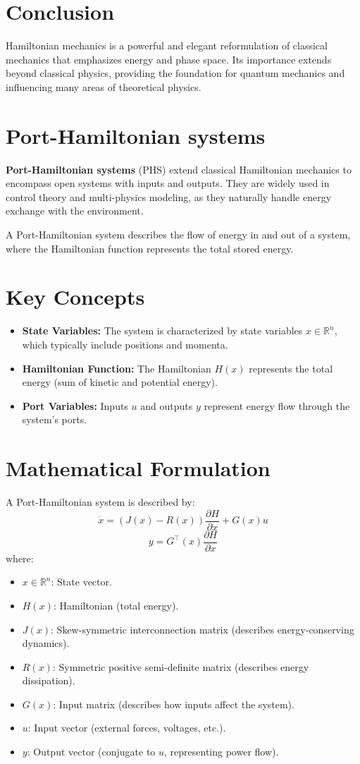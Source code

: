 \section{Conclusion}
Hamiltonian mechanics is a powerful and elegant reformulation of classical mechanics that emphasizes energy and phase space. Its importance extends beyond classical physics, providing the foundation for quantum mechanics and influencing many areas of theoretical physics.



\section{Port-Hamiltonian systems}
\textbf{Port-Hamiltonian systems} (PHS) extend classical Hamiltonian mechanics to encompass open systems with inputs and outputs. They are widely used in control theory and multi-physics modeling, as they naturally handle energy exchange with the environment.

A Port-Hamiltonian system describes the flow of energy in and out of a system, where the Hamiltonian function represents the total stored energy.

\section{Key Concepts}
\begin{itemize}
    \item \textbf{State Variables:} The system is characterized by state variables $x \in \mathbb{R}^n$, which typically include positions and momenta.
    \item \textbf{Hamiltonian Function:} The Hamiltonian $H(x)$ represents the total energy (sum of kinetic and potential energy).
    \item \textbf{Port Variables:} Inputs $u$ and outputs $y$ represent energy flow through the system's ports.
\end{itemize}

\section{Mathematical Formulation}
A Port-Hamiltonian system is described by:
\[
\dot{x} = \left( J(x) - R(x) \right) \frac{\partial H}{\partial x} + G(x) u
\]
\[
y = G^\top(x) \frac{\partial H}{\partial x}
\]
where:
\begin{itemize}
    \item $x \in \mathbb{R}^n$: State vector.
    \item $H(x)$: Hamiltonian (total energy).
    \item $J(x)$: Skew-symmetric interconnection matrix (describes energy-conserving dynamics).
    \item $R(x)$: Symmetric positive semi-definite matrix (describes energy dissipation).
    \item $G(x)$: Input matrix (describes how inputs affect the system).
    \item $u$: Input vector (external forces, voltages, etc.).
    \item $y$: Output vector (conjugate to $u$, representing power flow).
\end{itemize}

